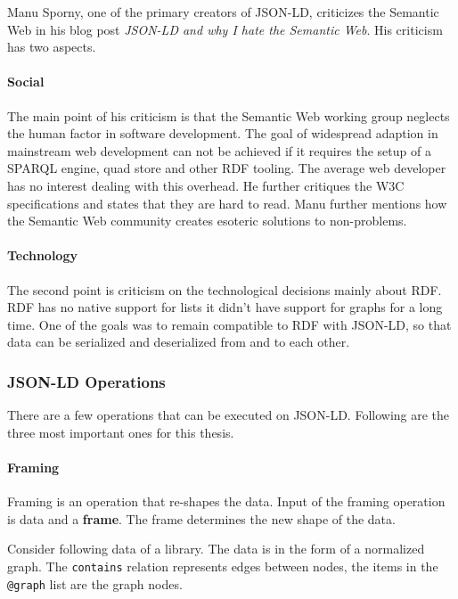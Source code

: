 Manu Sporny, one of the primary creators of JSON-LD, criticizes the Semantic Web in his blog post \textit{JSON-LD and why I hate the Semantic Web}. His criticism has two aspects.

\paragraph{Social}
The main point of his criticism is that the Semantic Web working group neglects the human factor in software development. The goal of widespread adaption in mainstream web development can not be achieved if it requires the setup of a SPARQL engine, quad store and other RDF tooling. The average web developer has no interest dealing with this overhead. He further critiques the W3C specifications and states that they are hard to read. \citep{semanticwebrevisited} Manu further mentions how the Semantic Web community creates esoteric solutions to non-problems. \citep{semanticwebrevisited}

\paragraph{Technology}
The second point is criticism on the technological decisions mainly about RDF. RDF has no native support for lists it didn't have support for graphs for a long time. One of the goals was to remain compatible to RDF with JSON-LD, so that data can be serialized and deserialized from and to each other. \citep{semanticwebrevisited}

\subsubsection{JSON-LD Operations}
There are a few operations that can be executed on JSON-LD. Following are the three most important ones for this thesis.

\paragraph{Framing}

Framing is an operation that re-shapes the data. Input of the framing operation is data and a \textbf{frame}. The frame determines the new shape of the data.

Consider following data of a library. The data is in the form of a normalized graph. The \lstinline{contains} relation represents edges between nodes, the items in the \lstinline{@graph} list are the graph nodes.

